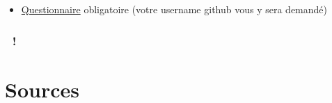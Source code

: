 \begin{itemize}
\tightlist
\item
  \href{https://docs.google.com/spreadsheet/viewform?formkey=dDg5Znh5akRBV1hPbC1qYlVRV3BONFE6MQ}{Questionnaire}
  obligatoire (votre username github vous y sera demandé)
\end{itemize}

\hypertarget{section}{%
\subsubsection{🙏 !}\label{section}}

\hypertarget{sources}{%
\section{Sources}\label{sources}}
